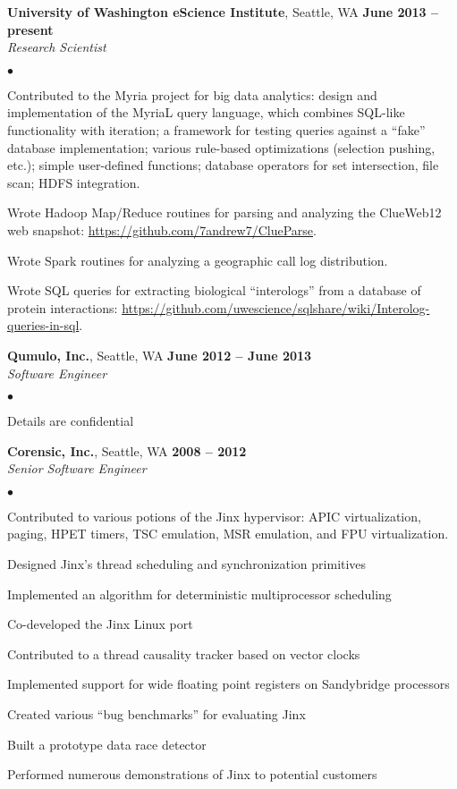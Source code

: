 \documentclass[margin,line]{res}
\newenvironment{list2}{
  \begin{list}{$\bullet$}{%
      \setlength{\itemsep}{0in}
      \setlength{\parsep}{0in} \setlength{\parskip}{0in}
      \setlength{\topsep}{0in} \setlength{\partopsep}{0in} 
      \setlength{\leftmargin}{0.2in}}}{\end{list}}
\begin{document}
\begin{resume}
\textbf{University of Washington eScience Institute}, Seattle, WA \hfill \textbf{June 2013 -- present} \\\vspace{-4mm}
\textsl{Research Scientist} \\
\begin{list2}
\item Contributed to the Myria project for big data analytics: design and implementation of the MyriaL query language, which combines SQL-like functionality with iteration; a framework for testing queries against a ``fake'' database implementation; various rule-based optimizations (selection pushing, etc.); simple user-defined functions; database operators for set intersection, file scan; HDFS integration.
\item Wrote Hadoop Map/Reduce routines for parsing and analyzing the ClueWeb12 web snapshot: 
\url{https://github.com/7andrew7/ClueParse}.
\item Wrote Spark routines for analyzing a geographic call log distribution.
\item Wrote SQL queries for extracting biological ``interologs'' from a database of protein interactions:
\url{https://github.com/uwescience/sqlshare/wiki/Interolog-queries-in-sql}.
\end{list2}

\textbf{Qumulo, Inc.}, Seattle, WA \hfill \textbf{June 2012 -- June 2013} \\\vspace{-4mm}
\textsl{Software Engineer}  \\
\begin{list2}
  \item Details are confidential
  \end{list2}

\textbf{Corensic, Inc.}, Seattle, WA  \hfill \textbf{2008 -- 2012} \\\vspace{-4mm}
\textsl{Senior Software Engineer} \\
\begin{list2}
  \item Contributed to various potions of the Jinx hypervisor: APIC
    virtualization, paging,  HPET timers, TSC emulation, MSR emulation, and
    FPU virtualization.
  \item Designed Jinx's thread scheduling and synchronization primitives
  \item Implemented an algorithm for deterministic multiprocessor scheduling
  \item Co-developed the Jinx Linux port
  \item Contributed to a thread causality tracker based on vector clocks
  \item Implemented support for wide floating point registers on Sandybridge processors
  \item Created various ``bug benchmarks''  for evaluating Jinx
  \item Built a prototype data race detector
  \item Performed numerous demonstrations of Jinx to potential customers
\end{list2}


\end{resume}
\end{document}
